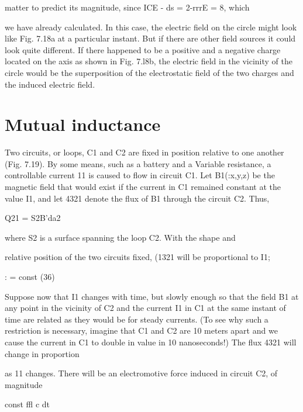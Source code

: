 matter to predict its magnitude, since ICE - ds = 2-rrrE = 8, which

we have already calculated. In this case, the electric field on the
circle might look like Fig. 7.18a at a particular instant. But if there
are other field sources it could look quite different. If there happened
to be a positive and a negative charge located on the axis as shown
in Fig. 7.l8b, the electric field in the vicinity of the circle would be
the superposition of the electrostatic field of the two charges and the
induced electric field.

 

 

\section{Mutual inductance}

Two circuits, or loops, C1 and C2 are fixed in position relative to
one another (Fig. 7.19). By some means, such as a battery and
a Variable resistance, a controllable current 11 is caused to flow in
circuit C1. Let B1(:x,y,z) be the magnetic field that would exist if
the current in C1 remained constant at the value I1, and let 4321 denote
the flux of B1 through the circuit C2. Thus,

\begin{equation}
\end{equation}
Q21 = S2B'da2 

where S2 is a surface spanning the loop C2. With the shape and

relative position of the two circuits fixed, (1321 will be proportional
to I1;

\begin{equation}
\end{equation}
: = const (36)

Suppose now that I1 changes with time, but slowly enough so that
the field B1 at any point in the vicinity of C2 and the current I1 in C1
at the same instant of time are related as they would be for steady
currents. (To see why such a restriction is necessary, imagine that C1
and C2 are 10 meters apart and we cause the current in C1 to double in
value in 10 nanoseconds!) The flux 4321 will change in proportion

as 11 changes. There will be an electromotive force induced in
circuit C2, of magnitude

\begin{equation}
\end{equation}
const ffl
c dt

